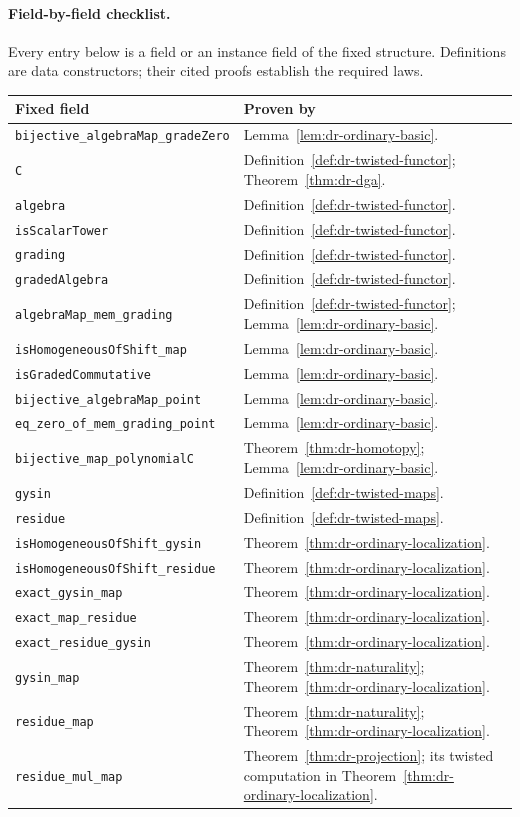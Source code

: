 \documentclass[11pt]{article}
\theoremstyle{definition}
\theoremstyle{remark}
\begin{document}
\paragraph{Field-by-field checklist.}
Every entry below is a field or an instance field of the fixed structure. Definitions are data constructors; their cited proofs establish the required laws.
{\small
\begin{longtable}{@{}p{}p{}@{}}
\toprule
Fixed field & Proven by\\\midrule\endhead
\nolinkurl{bijective_algebraMap_gradeZero} & Lemma~\ref{lem:dr-ordinary-basic}.\\
\nolinkurl{C} & Definition~\ref{def:dr-twisted-functor}; Theorem~\ref{thm:dr-dga}.\\
\nolinkurl{algebra} & Definition~\ref{def:dr-twisted-functor}.\\
\nolinkurl{isScalarTower} & Definition~\ref{def:dr-twisted-functor}.\\
\nolinkurl{grading} & Definition~\ref{def:dr-twisted-functor}.\\
\nolinkurl{gradedAlgebra} & Definition~\ref{def:dr-twisted-functor}.\\
\nolinkurl{algebraMap_mem_grading} & Definition~\ref{def:dr-twisted-functor}; Lemma~\ref{lem:dr-ordinary-basic}.\\
\nolinkurl{isHomogeneousOfShift_map} & Lemma~\ref{lem:dr-ordinary-basic}.\\
\nolinkurl{isGradedCommutative} & Lemma~\ref{lem:dr-ordinary-basic}.\\
\nolinkurl{bijective_algebraMap_point} & Lemma~\ref{lem:dr-ordinary-basic}.\\
\nolinkurl{eq_zero_of_mem_grading_point} & Lemma~\ref{lem:dr-ordinary-basic}.\\
\nolinkurl{bijective_map_polynomialC} & Theorem~\ref{thm:dr-homotopy}; Lemma~\ref{lem:dr-ordinary-basic}.\\
\nolinkurl{gysin} & Definition~\ref{def:dr-twisted-maps}.\\
\nolinkurl{residue} & Definition~\ref{def:dr-twisted-maps}.\\
\nolinkurl{isHomogeneousOfShift_gysin} & Theorem~\ref{thm:dr-ordinary-localization}.\\
\nolinkurl{isHomogeneousOfShift_residue} & Theorem~\ref{thm:dr-ordinary-localization}.\\
\nolinkurl{exact_gysin_map} & Theorem~\ref{thm:dr-ordinary-localization}.\\
\nolinkurl{exact_map_residue} & Theorem~\ref{thm:dr-ordinary-localization}.\\
\nolinkurl{exact_residue_gysin} & Theorem~\ref{thm:dr-ordinary-localization}.\\
\nolinkurl{gysin_map} & Theorem~\ref{thm:dr-naturality}; Theorem~\ref{thm:dr-ordinary-localization}.\\
\nolinkurl{residue_map} & Theorem~\ref{thm:dr-naturality}; Theorem~\ref{thm:dr-ordinary-localization}.\\
\nolinkurl{residue_mul_map} & Theorem~\ref{thm:dr-projection}; its twisted computation in Theorem~\ref{thm:dr-ordinary-localization}.\\
\bottomrule
\end{longtable}
}
\end{document}
